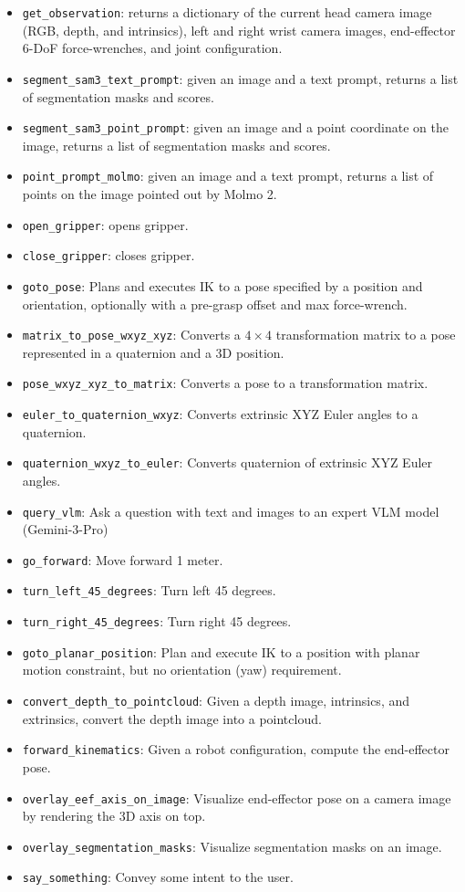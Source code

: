 \begin{itemize}
    \item \verb|get_observation|: returns a dictionary of the current head camera image (RGB, depth, and intrinsics), left and right wrist camera images, end-effector 6-DoF force-wrenches, and joint configuration.
    \item \verb|segment_sam3_text_prompt|: given an image and a text prompt, returns a list of segmentation masks and scores.
    \item \verb|segment_sam3_point_prompt|: given an image and a point coordinate on the image, returns a list of segmentation masks and scores.
    \item \verb|point_prompt_molmo|: given an image and a text prompt, returns a list of points on the image pointed out by Molmo 2.
    \item \verb|open_gripper|: opens gripper.
    \item \verb|close_gripper|: closes gripper.
    \item \verb|goto_pose|: Plans and executes IK to a pose specified by a position and orientation, optionally with a pre-grasp offset and max force-wrench.
    \item \verb|matrix_to_pose_wxyz_xyz|: Converts a $4\times4$ transformation matrix to a pose represented in a quaternion and a 3D position.
    \item \verb|pose_wxyz_xyz_to_matrix|: Converts a pose to a transformation matrix.
    \item \verb|euler_to_quaternion_wxyz|: Converts extrinsic XYZ Euler angles to a quaternion.
    \item \verb|quaternion_wxyz_to_euler|: Converts quaternion of extrinsic XYZ Euler angles.
    \item \verb|query_vlm|: Ask a question with text and images to an expert VLM model (Gemini-3-Pro)
    \item \verb|go_forward|: Move forward 1 meter.
    \item \verb|turn_left_45_degrees|: Turn left 45 degrees.
    \item \verb|turn_right_45_degrees|: Turn right 45 degrees.
    \item \verb|goto_planar_position|: Plan and execute IK to a position with planar motion constraint, but no orientation (yaw) requirement.
    \item \verb|convert_depth_to_pointcloud|: Given a depth image, intrinsics, and extrinsics, convert the depth image into a pointcloud.
    \item \verb|forward_kinematics|: Given a robot configuration, compute the end-effector pose.
    \item \verb|overlay_eef_axis_on_image|: Visualize end-effector pose on a camera image by rendering the 3D axis on top.
    \item \verb|overlay_segmentation_masks|: Visualize segmentation masks on an image.
    \item \verb|say_something|: Convey some intent to the user.
\end{itemize}

